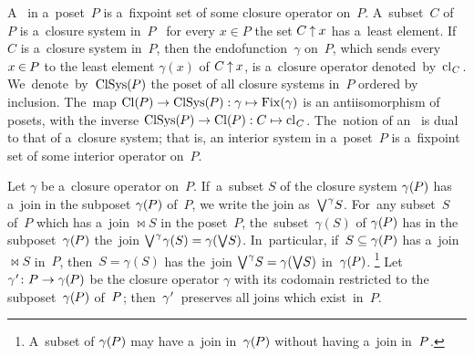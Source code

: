 \documentclass[11pt,letterpaper]{article}
\begin{document}
A~ in a~poset~$P$
	is a~fixpoint set of some closure operator on~$P$.
A~subset~$C$ of~$P$ is a~closure system in~$P$
	\iff\ for every $x\in P$ the set $C\mathbin{\uparrow} x$ has a~least element.
If $C$ is a~closure system in~$P$,
then the endofunction~$\gamma$ on~$P$, which sends every $x\mspace{-1mu}\in\mspace{-1mu} P$
	to the least element $\gamma(x)$ of $C\mathbin{\uparrow} x$,
is a~closure operator denoted~by~$\mathop{\smash{\mathrm{cl}}}\nolimits_{\mspace{1mu} C}\mspace{1mu}$.
We~de\-note~by~$\mathop{\smash{\mathrm{ClSys}}}\nolimits(\mspace{-1mu} P)$ the poset of all closure systems in~$P$ ordered by inclusion.
The~map $\mathop{\smash{\mathrm{Cl}}}\nolimits(\mspace{-1mu} P)\to\mathop{\smash{\mathrm{ClSys}}}\nolimits(\mspace{-1mu} P) : \gamma\mapsto\mathop{\smash{\mathrm{Fix}}}\nolimits(\gamma)$
	is an antiisomorphism of posets,
with the inverse $\mathop{\smash{\mathrm{ClSys}}}\nolimits(\mspace{-1mu} P)\to\mathop{\smash{\mathrm{Cl}}}\nolimits(\mspace{-1mu} P) : C\mapsto\mathop{\smash{\mathrm{cl}}}\nolimits_{\mspace{1mu} C}\mspace{1mu}$.
The~notion of an~ is dual to that of a~closure system;
that is, an interior system in a~poset~$P$
	is a~fixpoint set of some interior operator on~$P$.

Let $\gamma$ be a~closure operator on~$P$.
If~a~subset $S$ of the closure system $\gamma(\mspace{-1mu} P)$
	has a~join in the subposet $\gamma(\mspace{-1mu} P)$ of~$P$,
we write the join as~$\bigvee^{\mspace{1mu}\gamma}\!S$.
For~any subset~$S$ of~$P$ which has a~join $\Join\!S$ in the poset~$P$,
the~subset~$\gamma(S)$ of $\gamma(\mspace{-1mu} P)$ has in the subposet~$\gamma(\mspace{-1mu} P)$ the~join
	$\bigvee^{\mspace{1mu}\gamma}\mspace{-2mu}\gamma(S) = \gamma(\bigvee\!S)$.
In~particular, if~$S\subseteq\gamma(\mspace{-1mu} P)$ has a~join $\Join\!S$ in~$P$,
then~$S = \gamma(S)$ has the~join $\bigvee^{\mspace{1mu}\gamma}\!S = \gamma(\bigvee\!S)$ in~$\gamma(\mspace{-1mu} P)$.%
%
\footnote{A~subset of $\gamma(\mspace{-1mu} P)$ may have a~join in~$\gamma(\mspace{-1mu} P)$
	without having a~join in~$P\mspace{1mu}$.}
%
Let~$\gamma^{\mspace{1mu}\prime}\colon P\to\gamma(\mspace{-1mu} P)$
	be the closure operator $\gamma$
		with its codomain restricted to the subposet~$\gamma(\mspace{-1mu} P)$ of~$P\mspace{1mu}$;
then~$\gamma^{\mspace{1mu}\prime}$~preserves all joins which exist~in~$P$.
\begin{comment}
On the other hand, the inclusion map $\kappa\colon (\negtinysp P)\into P$
	preserves all meets that exist in $\gamma(\negtinysp P)\tinysp$:
if $S\subseteq\gamma(\negtinysp P)$ has a~meet $\Meet^{\!\gamma}\!S$ in $\gamma(\negtinysp P)$,
then $\Meet^{\!\gamma}\!S = \kappa(\Meet^{\!\gamma}\!S) = \Meet\negtinysp S$,
	where the last meet is taken in~$P$.
Moreover, if a~subset $S$ of $\gamma(\negtinysp P)$ has a~meet $\Meet\negtinysp S$ in~$P$,
then this meet belongs to $\gamma(\negtinysp P)$
	and hence is the meet of $S$ in~$\gamma(\negtinysp P)\dtinysp$:
		$\Meet\negtinysp S=\Meet^{\!\gamma}\!S$.
Therefore, a~subset $S$ of $\gamma(\negtinysp P)$ has a~meet in~$\gamma(\negtinysp P)$ \iff\ it has a~meet in~$P$,
	and when the two meets exist they are equal.
\end{comment}
\end{document}
